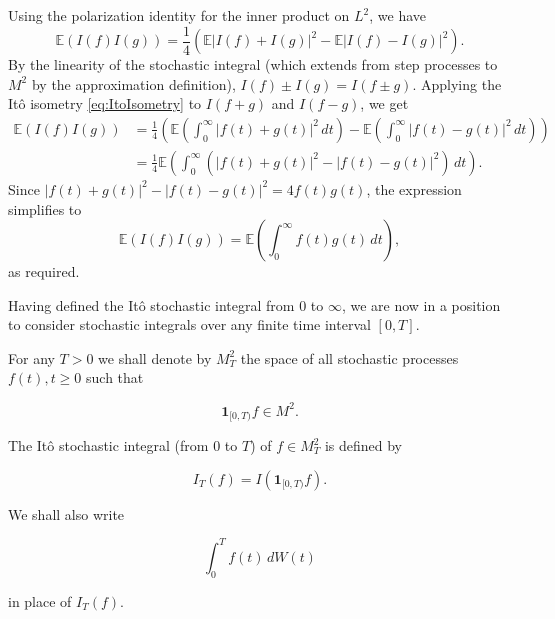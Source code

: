 \begin{Solution}
Using the polarization identity for the inner product on $L^2$, we have
\begin{equation*}
\mathbb{E}(I(f)I(g)) = \frac{1}{4} \left( \mathbb{E}|I(f) + I(g)|^2 - \mathbb{E}|I(f) - I(g)|^2 \right).
\end{equation*}
By the linearity of the stochastic integral (which extends from step processes to $M^2$ by the approximation definition), $I(f) \pm I(g) = I(f \pm g)$. Applying the Itô isometry \eqref{eq:ItoIsometry} to $I(f+g)$ and $I(f-g)$, we get
\begin{align*}
\mathbb{E}(I(f)I(g)) &= \frac{1}{4} \left( \mathbb{E}\left(\int_0^\infty |f(t) + g(t)|^2 \, dt\right) - \mathbb{E}\left(\int_0^\infty |f(t) - g(t)|^2 \, dt\right) \right) \\
&= \frac{1}{4} \mathbb{E} \left( \int_0^\infty (|f(t) + g(t)|^2 - |f(t) - g(t)|^2) \, dt \right).
\end{align*}
Since $|f(t) + g(t)|^2 - |f(t) - g(t)|^2 = 4f(t)g(t)$, the expression simplifies to
\begin{equation*}
\mathbb{E}(I(f)I(g)) = \mathbb{E}\left( \int_0^\infty f(t)g(t) \, dt \right),
\end{equation*}
as required.
\end{Solution}

Having defined the Itô stochastic integral from $0$ to $\infty$, we are now in a position to consider stochastic integrals over any finite time interval $[0, T]$.

\begin{Definition}
\label{def:7.5}
For any $T > 0$ we shall denote by $M_T^2$ the space of all stochastic processes $f(t), t \geq 0$ such that

\begin{equation}
\mathbf{1}_{[0, T)} f \in M^2.
\end{equation}

The Itô stochastic integral (from $0$ to $T$) of $f \in M_T^2$ is defined by

\begin{equation}
I_T(f) = I(\mathbf{1}_{[0, T)} f).
\label{eq:ItoIntegralFinite}
\end{equation}

We shall also write

\begin{equation}
\int_0^T f(t) \, dW(t)
\end{equation}

in place of $I_T(f)$.
\end{Definition}

